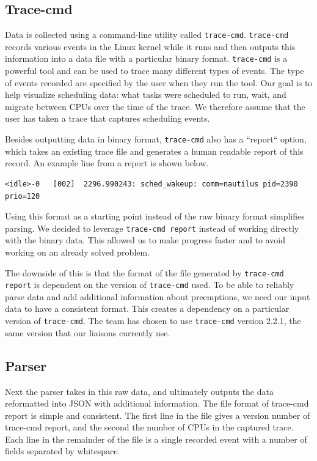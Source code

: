 \documentclass{hmcclinic}
\begin{document}
  \subsection{Trace-cmd}

  Data is collected using a command-line utility called \texttt{trace-cmd}.
  \texttt{trace-cmd} records various events in the Linux kernel while it runs and then
  outputs this information into a data file with a particular binary format.
  \texttt{trace-cmd} is a powerful tool and can be used to trace many different types of
  events. The type of events recorded are specified by the user when they run
  the tool. Our goal is to help visualize scheduling data: what tasks were
  scheduled to run, wait, and migrate between CPUs over the time of the trace.
  We therefore assume that the user has taken a trace that captures scheduling
  events.

  Besides outputting data in binary format, \texttt{trace-cmd} also has a ``report``
  option, which takes an existing trace file and generates a human readable
  report of this record. An example line from a report is shown below.
  
\footnotesize\begin{verbatim}<idle>-0   [002]  2296.990243: sched_wakeup: comm=nautilus pid=2390 prio=120\end{verbatim}

\normalsize
  Using this format as a starting point instead of the
  raw binary format simplifies parsing.  We decided to leverage
  \texttt{trace-cmd report}
  instead of working directly with the binary data. This allowed us to make
  progress faster and to avoid working on an already solved problem.

  The downside of this is that the format of the file generated by \texttt{trace-cmd
  report} is dependent on the version of \texttt{trace-cmd} used. To be able to reliably
  parse data and add additional information about preemptions, we need our input
  data to have a consistent format. This creates a dependency on a particular
  version of \texttt{trace-cmd}. The team has chosen to use \texttt{trace-cmd} version 2.2.1, 
  the same version that our liaisons currently use.

  \subsection{Parser}
  Next the parser takes in this raw data, and ultimately outputs the data
  reformatted into JSON with additional information. The file format of
  trace-cmd report is simple and consistent. The first line in the file
  gives a version number of trace-cmd report, and the second the number of
  CPUs in the captured trace. Each line in the remainder of the file is a
  single recorded event with a number of fields separated by whitespace.
   
\end{document}
